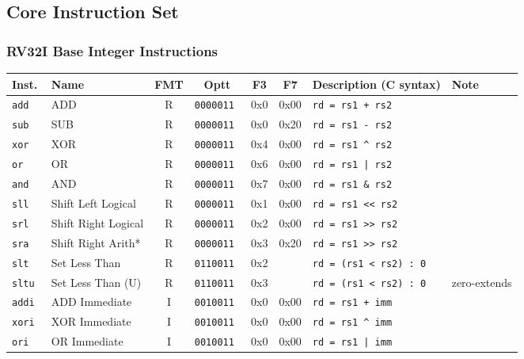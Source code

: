 \subsection*{Core Instruction Set}

\subsubsection*{RV32I Base Integer Instructions}

\begin{tabular}
{l | l | c | c | c | c | l | l} \hline
Inst.       & Name                    & FMT & Optt        & F3  & F7    & Description (C syntax)          & Note     \\ \hline
\tt{add}  & ADD                     & R  & \tt{0000011} & 0x0 & 0x00  & \tt{rd = rs1 + rs2}           & \\
\tt{sub}  & SUB                     & R  & \tt{0000011} & 0x0 & 0x20  & \tt{rd = rs1 - rs2}           & \\
\tt{xor}  & XOR                     & R  & \tt{0000011} & 0x4 & 0x00  & \tt{rd = rs1 \^{} rs2}        & \\
\tt{or}   & OR                      & R  & \tt{0000011} & 0x6 & 0x00  & \tt{rd = rs1 | rs2}           & \\
\tt{and}  & AND                     & R  & \tt{0000011} & 0x7 & 0x00  & \tt{rd = rs1 \& rs2}          & \\
\tt{sll}  & Shift Left Logical      & R  & \tt{0000011} & 0x1 & 0x00  & \tt{rd = rs1 << rs2}          & \\
\tt{srl}  & Shift Right Logical     & R  & \tt{0000011} & 0x2 & 0x00  & \tt{rd = rs1 >> rs2}          & \\
\tt{sra}  & Shift Right Arith*      & R  & \tt{0000011} & 0x3 & 0x20  & \tt{rd = rs1 >> rs2}          & \\
\tt{slt}  & Set Less Than           & R  & \tt{0110011} & 0x2 &       & \tt{rd = (rs1 < rs2) \? 1 : 0} & \\
\tt{sltu} & Set Less Than (U)       & R  & \tt{0110011} & 0x3 &       & \tt{rd = (rs1 < rs2) \? 1 : 0} & zero-extends \\ \hline
\tt{addi} & ADD Immediate           & I  & \tt{0010011} & 0x0 & 0x00  & \tt{rd = rs1 + imm}           & \\
\tt{xori} & XOR Immediate           & I  & \tt{0010011} & 0x0 & 0x00  & \tt{rd = rs1 \^{} imm}        & \\
\tt{ori}  & OR Immediate            & I  & \tt{0010011} & 0x0 & 0x00  & \tt{rd = rs1 | imm}           & \\

\end{tabular}
